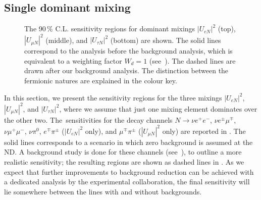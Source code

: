\subsection{Single dominant mixing}
\label{sec:dominant}

\begin{figure}
	\centering
	\vspace{0.05em}

	\vspace{0.05em}


	\footnotesize
	\caption{The 90\,\% C.L. sensitivity regions for dominant mixings %
		$|U_{e N}|^2$ (top), $|U_{\mu N}|^2$ (middle), and $|U_{\tau N}|^2$ (bottom) are shown.
		The solid lines correspond to the analysis before the background analysis, which is equivalent %
		to a weighting factor $W_d = 1$ (see~).
		The dashed lines are drawn after our background analysis.
		The distinction between the fermionic natures are explained in the colour key.}
	\label{fig:senseW}
\end{figure}

In this section, we present the sensitivity regions for the three mixings $|U_{e N}|^2$, $|U_{\mu N}|^2$, and %
$|U_{\tau N}|^2$, where we assume that just one mixing element dominates over the other two.
The~sensitivities for the decay channels $N\to\nu e^+ e^-$, $\nu e^\pm \mu^\mp$, $\nu \mu^+ \mu^-$, $\nu \pi^0$, %
$e^\mp \pi^\pm$ ($|U_{e N}|^2$ only), and $\mu^\mp \pi^\pm$ ($|U_{\mu N}|^2$ only) are reported in .
The solid lines corresponds to a scenario in which zero background is assumed at the ND.
A background study is done for these channels (see~), to outline a more realistic sensitivity; %
the resulting regions are shown as dashed lines in .
As we expect that further improvements to background reduction can be achieved with a dedicated analysis by the experimental collaboration,
the final sensitivity will lie somewhere between the lines with and without backgrounds.

